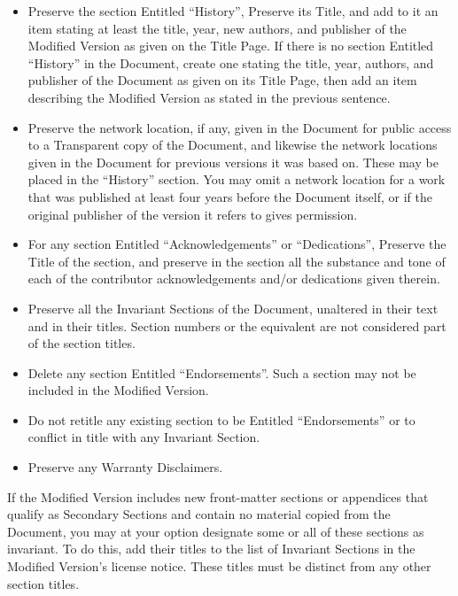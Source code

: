 \begin{itemize}
    \item[I.]
          Preserve the section Entitled ``History'', Preserve its Title, and add
          to it an item stating at least the title, year, new authors, and
          publisher of the Modified Version as given on the Title Page.  If
          there is no section Entitled ``History'' in the Document, create one
          stating the title, year, authors, and publisher of the Document as
          given on its Title Page, then add an item describing the Modified
          Version as stated in the previous sentence.

    \item[J.]
          Preserve the network location, if any, given in the Document for
          public access to a Transparent copy of the Document, and likewise
          the network locations given in the Document for previous versions
          it was based on.  These may be placed in the ``History'' section.
          You may omit a network location for a work that was published at
          least four years before the Document itself, or if the original
          publisher of the version it refers to gives permission.

    \item[K.]
          For any section Entitled ``Acknowledgements'' or ``Dedications'',
          Preserve the Title of the section, and preserve in the section all
          the substance and tone of each of the contributor acknowledgements
          and/or dedications given therein.

    \item[L.]
          Preserve all the Invariant Sections of the Document,
          unaltered in their text and in their titles.  Section numbers
          or the equivalent are not considered part of the section titles.

    \item[M.]
          Delete any section Entitled ``Endorsements''.  Such a section
          may not be included in the Modified Version.

    \item[N.]
          Do not retitle any existing section to be Entitled ``Endorsements''
          or to conflict in title with any Invariant Section.

    \item[O.]
          Preserve any Warranty Disclaimers.
\end{itemize}

If the Modified Version includes new front-matter sections or
appendices that qualify as Secondary Sections and contain no material
copied from the Document, you may at your option designate some or all
of these sections as invariant.  To do this, add their titles to the
list of Invariant Sections in the Modified Version's license notice.
These titles must be distinct from any other section titles.

